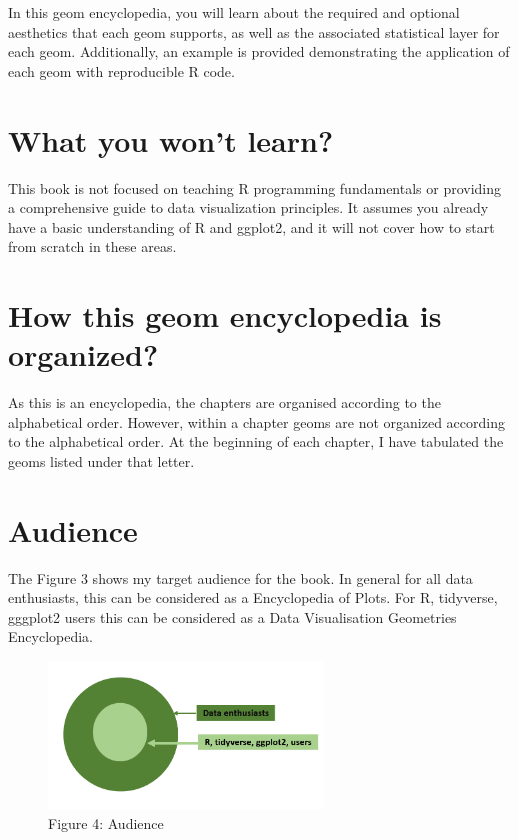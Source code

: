 \documentclass[
  letterpaper,
  DIV=11,
  numbers=noendperiod]{scrreprt}
\begin{document}
In this {geom encyclopedia}, you will learn about the required and
optional aesthetics that each geom supports, as well as the associated
statistical layer for each geom. Additionally, an example is provided
demonstrating the application of each geom with reproducible R code.

\section*{What you won't learn?}\label{what-you-wont-learn}


This book is not focused on teaching R programming fundamentals or
providing a comprehensive guide to data visualization principles. It
assumes you already have a basic understanding of R and ggplot2, and it
will not cover how to start from scratch in these areas.

\section*{\texorpdfstring{How this {geom encyclopedia} is
organized?}{How this geom encyclopedia is organized?}}\label{how-this-geom-encyclopedia-is-organized}


As this is an encyclopedia, the chapters are organised according to the
alphabetical order. However, within a chapter geoms are not organized
according to the alphabetical order. At the beginning of each chapter, I
have tabulated the geoms listed under that letter.

\section*{Audience}\label{audience}


The Figure 3 shows my target audience for the book. In general for all
data enthusiasts, this can be considered as a {Encyclopedia of Plots}.
For R, tidyverse, gggplot2 users this can be considered as a {Data
Visualisation Geometries Encyclopedia}.

\begin{figure}[H]

{\centering \includegraphics[width=2.87in,height=\textheight,keepaspectratio]{audience.png}

}

\caption{Figure 4: Audience}

\end{figure}%
\end{document}
